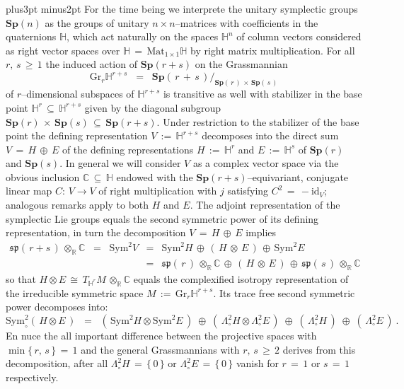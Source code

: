 \documentclass[12pt]{article}
\def\C{\mathbb{C}}
\def\Gr{\mathrm{Gr}}
\def\H{\mathbb{H}}
\def\id{\mathrm{id}}
\def\L{\Lambda}
\def\pfill{\vskip6pt plus3pt minus2pt\noindent}
\def\R{\mathbb{R}}
\def\S{\mathrm{Sym}}
\def\sp{\mathfrak{sp}}
\def\Sp{\mathbf{Sp}}
\begin{document}
 \pfill
 For the time being we interprete the unitary symplectic groups $\Sp(n)$
 as the groups of unitary $n\times n$--matrices with coefficients in the
 quaternions $\H$, which act naturally on the spaces $\H^n$ of column vectors
 considered as right vector spaces over $\H\,=\,\mathrm{Mat}_{1\times 1}\H$
 by right matrix multiplication. For all $r,\,s\,\geq\,1$ the induced action of
 $\Sp(r+s)$ on the Grassmannian
 $$
  \Gr_r\H^{r+s}
  \;\;=\;\;
  \Sp(\,r\,+\,s\,)/_{\displaystyle\Sp(\,r\,)\,\times\,\Sp(\,s\,)}
 $$
 of $r$--dimensional subspaces of $\H^{r+s}$ is transitive as well with
 stabilizer in the base point $\H^r\,\subseteq\,\H^{r+s}$ given by the
 diagonal subgroup $\Sp(r)\,\times\,\Sp(s)\,\subseteq\,\Sp(r+s)$. Under
 restriction to the stabilizer of the base point the defining representation
 $V\,:=\,\H^{r+s}$ decomposes into the direct sum $V\,=\,H\,\oplus\,E$ of the
 defining representations $H\,:=\,\H^r$ and $E\,:=\,\H^s$ of $\Sp(r)$ and
 $\Sp(s)$. In general we will consider $V$ as a complex vector space via
 the obvious inclusion $\C\,\subseteq\,\H$ endowed with the
 $\Sp(r+s)$--equivariant, conjugate linear map $C:\,V\longrightarrow V$ of
 right multiplication with $j$ satisfying $C^2\,=\,-\id_V$; analogous remarks
 apply to both $H$ and $E$. The adjoint representation of the symplectic Lie
 groups equals the second symmetric power of its defining representation, in
 turn the decomposition $V\,=\,H\,\oplus\,E$ implies
 \begin{eqnarray*}
  \sp(\,r+s\,)\,\otimes_\R\C
  \;\;=\;\;
  \S^2V
  &=&
  \S^2H\,\oplus\,(\,H\,\otimes\,E\,)\,\oplus\,\S^2E
  \\
  &=&
  \sp(\,r\,)\,\otimes_\R\C\,\oplus\,(\,H\,\otimes\,E\,)
  \,\oplus\,\sp(\,s\,)\,\otimes_\R\C
 \end{eqnarray*}
 so that $H\otimes E\,\cong\,T_{\H^r}M\,\otimes_\R\C$ equals the
 complexified isotropy representation of the irreducible symmetric space
 $M\,:=\,\Gr_r\H^{r+s}$. Its trace free second symmetric power
 decomposes into:
 \begin{equation}\label{grdec}
  \S^2_\circ(\,H\otimes E\,)
  \;\;=\;\;
  (\,\S^2H\otimes\S^2E\,)
  \;\oplus\;(\,\L^2_\circ H\otimes\L^2_\circ E\,)
  \;\oplus\;(\,\L^2_\circ H\,)\;\oplus\;(\,\L^2_\circ E\,)\ .
 \end{equation}
 En nuce the all important difference between the projective spaces with
 $\min\{\,r,\,s\,\}\,=\,1$ and the general Grassmannians with $r,\,s\,\geq\,2$
 derives from this decomposition, after all $\L^2_\circ H\,=\,\{\,0\,\}$ or
 $\L^2_\circ E\,=\,\{\,0\,\}$ vanish for $r\,=\,1$ or $s\,=\,1$ respectively.
\end{document}

